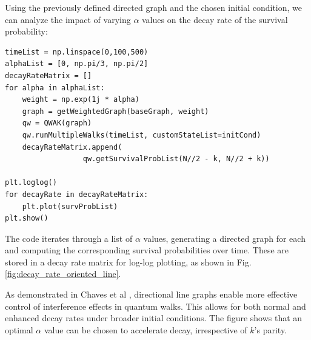 \documentclass[../../main.tex]{subfiles}
\begin{document}
Using the previously defined directed graph and the chosen initial condition, we
can analyze the impact of varying $\alpha$ values on the decay rate of the
survival probability:

\begin{lstlisting}[style=code]
timeList = np.linspace(0,100,500)
alphaList = [0, np.pi/3, np.pi/2]
decayRateMatrix = []
for alpha in alphaList:
    weight = np.exp(1j * alpha)
    graph = getWeightedGraph(baseGraph, weight)
    qw = QWAK(graph)
    qw.runMultipleWalks(timeList, customStateList=initCond)
    decayRateMatrix.append(
                  qw.getSurvivalProbList(N//2 - k, N//2 + k))

plt.loglog()
for decayRate in decayRateMatrix:
    plt.plot(survProbList)
plt.show()
\end{lstlisting}

The code iterates through a list of $\alpha$ values, generating a directed
graph for each and computing the corresponding survival probabilities over
time. These are stored in a decay rate matrix for log-log plotting, as shown in
Fig. \ref{fig:decay_rate_oriented_line}.

As demonstrated in Chaves et al \cite{Chaves2023}, directional line graphs
enable more effective control of interference effects in quantum walks. This
allows for both normal and enhanced decay rates under broader initial
conditions. The figure shows that an optimal $\alpha$ value can be chosen to
accelerate decay, irrespective of $k$'s parity.
\end{document}
